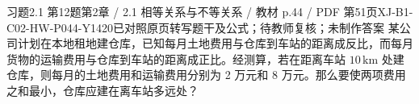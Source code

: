 \par\noindent\begin{minipage}{\linewidth}
\begin{bankitem}{习题2.1 第12题}{第2章 / 2.1 相等关系与不等关系 / 教材 p.44 / PDF 第51页}{XJ-B1-C02-HW-P044-Y1420}{已对照原页转写题干及公式；待教师复核；未制作答案}
某公司计划在本地租地建仓库，已知每月土地费用与仓库到车站的距离成反比，而每月货物的运输费用与仓库到车站的距离成正比。经测算，若在距离车站 $10\,\mathrm{km}$ 处建仓库，则每月的土地费用和运输费用分别为 2 万元和 8 万元。那么要使两项费用之和最小，仓库应建在离车站多远处？
\end{bankitem}
\end{minipage}\par\medskip
